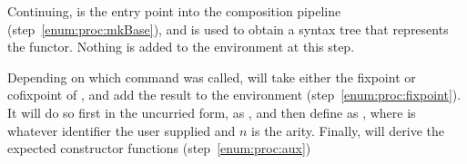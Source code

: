 Continuing,  is the entry point into the composition pipeline (step~\ref{enum:proc:mkBase}), and is used to obtain a syntax tree that represents the  functor.
Nothing is added to the environment at this step.

Depending on which command was called,  will take either the fixpoint or cofixpoint of , and
add the result to the environment (step~\ref{enum:proc:fixpoint}). It will do so first in the uncurried form, as , and
then define  as , where  is whatever identifier the
user supplied and $n$ is the arity.
Finally,  will derive the expected constructor functions (step~\ref{enum:proc:aux})


  
  
  
  




